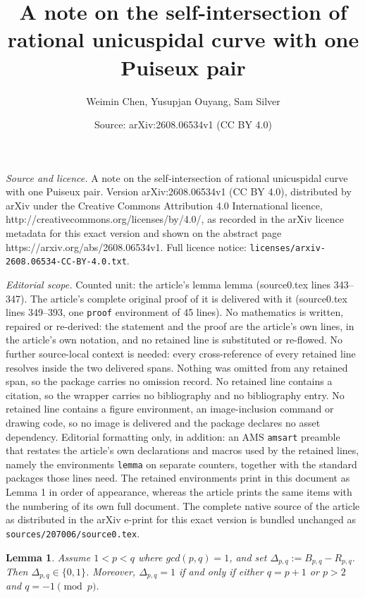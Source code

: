 \documentclass[10pt,a4paper]{amsart}
\title{A note on the self-intersection of rational unicuspidal curve with one Puiseux pair}
\author{Weimin Chen, Yusupjan Ouyang, Sam Silver}
\date{Source: arXiv:2608.06534v1 (CC BY 4.0)}
\newtheorem{lemma}{Lemma}
\begin{document}
\maketitle

\noindent\emph{Source and licence.} A note on the self-intersection of rational unicuspidal curve with one Puiseux pair. Version arXiv:2608.06534v1 (CC BY 4.0), distributed by arXiv under the Creative Commons Attribution 4.0 International licence, http://creativecommons.org/licenses/by/4.0/, as recorded in the arXiv licence metadata for this exact version and shown on the abstract page https://arxiv.org/abs/2608.06534v1. Full licence notice: \texttt{licenses/arxiv-2608.06534-CC-BY-4.0.txt}.\par\smallskip

\noindent\textit{Editorial scope.} Counted unit: the article's lemma lemma (source0.tex lines 343--347). The article's complete original proof of it is delivered with it (source0.tex lines 349--393, one \texttt{proof} environment of 45 lines). No mathematics is written, repaired or re-derived: the statement and the proof are the article's own lines, in the article's own notation, and no retained line is substituted or re-flowed.  No further source-local context is needed: every cross-reference of every retained line resolves inside the two delivered spans.  Nothing was omitted from any retained span, so the package carries no omission record.  No retained line contains a citation, so the wrapper carries no bibliography and no bibliography entry.  No retained line contains a figure environment, an image-inclusion command or drawing code, so no image is delivered and the package declares no asset dependency.  Editorial formatting only, in addition: an AMS \texttt{amsart} preamble that restates the article's own declarations and macros used by the retained lines, namely the environments \texttt{lemma} on separate counters, together with the standard packages those lines need.  The retained environments print in this document as Lemma 1 in order of appearance, whereas the article prints the same items with the numbering of its own full document.  The complete native source of the article as distributed in the arXiv e-print for this exact version is bundled unchanged as \texttt{sources/207006/source0.tex}.
\begin{lemma}
Assume $1<p<q$ where $gcd(p,q)=1$, and set $\Delta_{p,q}:=B_{p,q}-R_{p,q}$. 
Then $\Delta_{p,q}\in \{0,1\}$. Moreover, $\Delta_{p,q}=1$
if and only if either $q=p+1$ or $p>2$ and $q=-1\pmod{p}$. 
\end{lemma}
\end{document}
